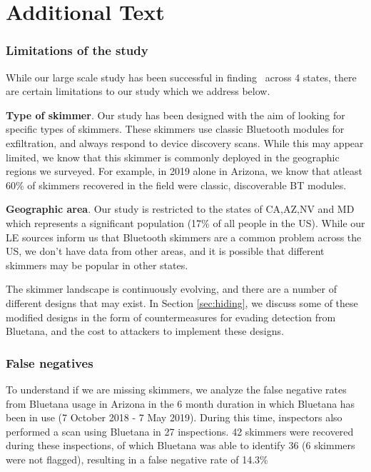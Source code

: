 
\section{Additional Text}
\label{sec:additionaltext}

\subsubsection*{Limitations of the study}
\label{sec:limitations}

While our large scale study has been successful in finding \totalskimmers~across 4 states, there are certain limitations to our study which we address below.
\newline

\textbf{Type of skimmer}. Our study has been designed with the aim of looking for specific types of skimmers. These skimmers use classic Bluetooth modules for exfiltration, and always respond to device discovery scans. While this may appear limited, we know that this skimmer is commonly deployed in the geographic regions we surveyed. For example, in 2019 alone in Arizona, we know that atleast 60\% of skimmers recovered in the field were classic, discoverable BT modules.
\newline

\textbf{Geographic area}. Our study is restricted to the states of CA,AZ,NV and MD which represents a significant population (17\% of all people in the US). While our LE sources inform us that Bluetooth skimmers are a common problem across the US, we don't have data from other areas, and it is possible that different skimmers may be popular in other states.
\newline

The skimmer landscape is continuously evolving, and there are a number of different designs that may exist. In Section \ref{sec:hiding}, we discuss some of these modified designs in the form of countermeasures for evading detection from Bluetana, and the cost to attackers to implement these designs.

\subsubsection*{False negatives}
\label{sec:falsenegative}

To understand if we are missing skimmers, we analyze the false negative rates from Bluetana usage in Arizona in the 6 month duration in which Bluetana has been in use (7 October 2018 - 7 May 2019). During this time, inspectors also performed a scan using Bluetana in 27 inspections. 42 skimmers were recovered during these inspections, of which Bluetana was able to identify 36 (6 skimmers were not flagged), resulting in a false negative rate of 14.3\%

